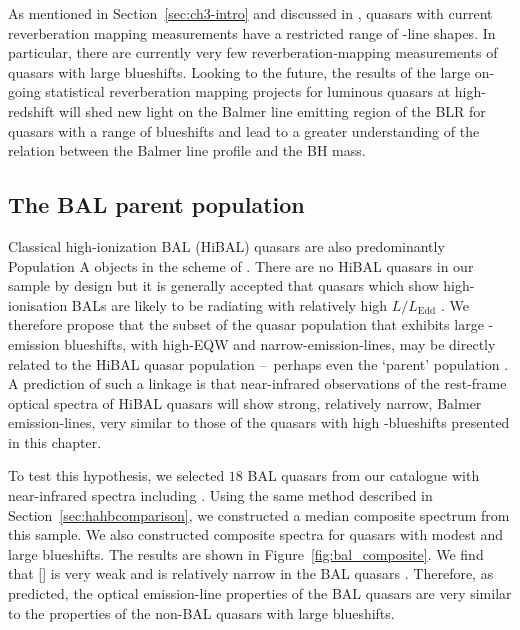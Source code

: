 As mentioned in Section~\ref{sec:ch3-intro} and discussed in \citet{richards11}, quasars with current reverberation mapping measurements have a restricted range of -line shapes. 
In particular, there are currently very few reverberation-mapping measurements of quasars with large  blueshifts. 
Looking to the future, the results of the large on-going statistical reverberation mapping projects \citep[e.g.][]{shen15,kingoz15} for luminous quasars at high-redshift will shed new light on the Balmer line emitting region of the BLR for quasars with a range of  blueshifts and lead to a greater understanding of the relation between the Balmer line profile and the BH mass.

\subsection{The BAL parent population}

Classical high-ionization BAL (HiBAL) quasars are also predominantly Population A objects in the scheme of \citet{sulentic00b}. 
There are no HiBAL quasars in our sample by design but it is generally accepted that quasars which show high-ionisation BALs are likely to be radiating with relatively high $L/L_{\text{Edd}}$ \citep[e.g.][]{zhang14}. 
We therefore propose that the subset of the quasar population that exhibits large -emission blueshifts, with high-EQW and narrow-\ha emission-lines, may be directly related to the HiBAL quasar population \---\ perhaps even the `parent' population \citep{richards06conf}. 
A prediction of such a linkage is that near-infrared observations of the rest-frame optical spectra of HiBAL quasars will show strong, relatively narrow, Balmer emission-lines, very similar to those of the quasars with high -blueshifts presented in this chapter. 

To test this hypothesis, we selected $18$  BAL quasars from our catalogue with near-infrared spectra including \hbns. 
Using the same method described in Section~\ref{sec:hahbcomparison}, we constructed a median composite spectrum from this sample. 
We also constructed composite spectra for quasars with modest and large  blueshifts. 
The results are shown in Figure~\ref{fig:bal_composite}. 
We find that [] is very weak and \hb is relatively narrow in the BAL quasars \citep[e.g.][]{yuan03}. 
Therefore, as predicted, the optical emission-line properties of the BAL quasars are very similar to the properties of the non-BAL quasars with large  blueshifts. 

